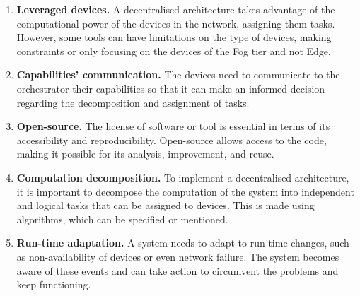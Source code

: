 \begin{enumerate}
    \item\textbf{Leveraged devices.} A decentralised architecture takes advantage of the computational power of the devices in the network, assigning them tasks. However, some tools can have limitations on the type of devices, making constraints or only focusing on the devices of the Fog tier and not Edge.
    \item\textbf{Capabilities' communication.} The devices need to communicate to the orchestrator their capabilities so that it can make an informed decision regarding the decomposition and assignment of tasks.
    \item\textbf{Open-source.} The license of software or tool is essential in terms of its accessibility and reproducibility. Open-source allows access to the code, making it possible for its analysis, improvement, and reuse.
    \item\textbf{Computation decomposition.} To implement a decentralised architecture, it is important to decompose the computation of the system into independent and logical tasks that can be assigned to devices. This is made using algorithms, which can be specified or mentioned.
    \item\textbf{Run-time adaptation.} A system needs to adapt to run-time changes, such as non-availability of devices or even network failure. The system becomes aware of these events and can take action to circumvent the problems and keep functioning.
\end{enumerate}

